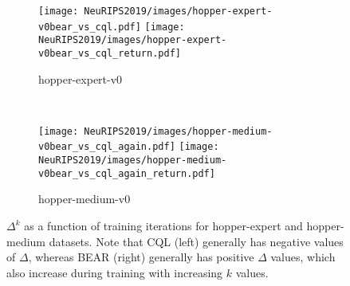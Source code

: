 \begin{figure}
    \begin{subfigure}[h]{0.49\linewidth}
      \centering
      \texttt{[image: NeuRIPS2019/images/hopper-expert-v0bear\_vs\_cql.pdf]}
      \texttt{[image: NeuRIPS2019/images/hopper-expert-v0bear\_vs\_cql\_return.pdf]}
      \caption{hopper-expert-v0}
    \end{subfigure}
    ~
    \begin{subfigure}[h]{0.49\linewidth}
      \centering
      \texttt{[image: NeuRIPS2019/images/hopper-medium-v0bear\_vs\_cql\_again.pdf]}
      \texttt{[image: NeuRIPS2019/images/hopper-medium-v0bear\_vs\_cql\_again\_return.pdf]}
      \caption{hopper-medium-v0}
    \end{subfigure}
    \caption{$\Delta^k$ as a function of training iterations for hopper-expert and hopper-medium datasets. Note that CQL (left) generally has negative values of $\Delta$, whereas BEAR (right) generally has positive $\Delta$ values, which also increase during training with increasing $k$ values.}
    \label{fig:delta_plots}
\end{figure}

